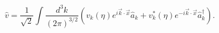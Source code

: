 \begin{equation}\label{eq:mode-expansion}
  \hat{v}=\frac{1}{\sqrt{2}}\int \frac{d^3 k}{(2 \pi)^{3/2}}
  \left(v_k  (\eta) e^{i\vec{k}\cdot\vec{x}}  \hat{a}_k
    +v_k^*(\eta)  e^{-i \vec{k}\cdot\vec{x}}\hat{a}^\dag_k\right).
\end{equation}

